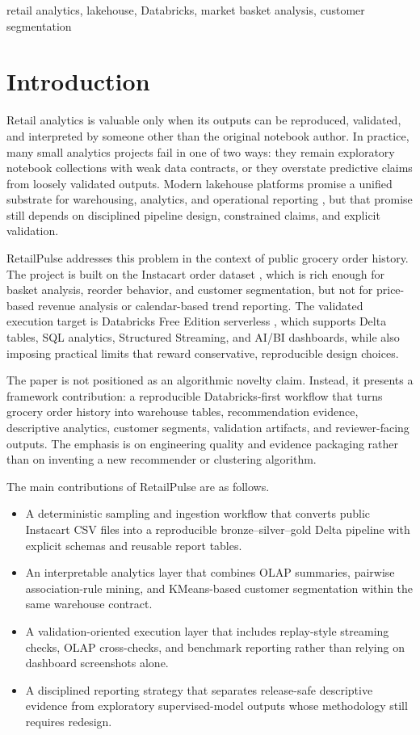 \documentclass[journal]{IEEEtran}
\begin{document}
\begin{IEEEkeywords}
retail analytics, lakehouse, Databricks, market basket analysis, customer segmentation
\end{IEEEkeywords}

\section{Introduction}
Retail analytics is valuable only when its outputs can be reproduced, validated, and interpreted by someone other than the original notebook author. In practice, many small analytics projects fail in one of two ways: they remain exploratory notebook collections with weak data contracts, or they overstate predictive claims from loosely validated outputs. Modern lakehouse platforms promise a unified substrate for warehousing, analytics, and operational reporting \cite{armbrust2020deltalake,zaharia2021lakehouse}, but that promise still depends on disciplined pipeline design, constrained claims, and explicit validation.

RetailPulse addresses this problem in the context of public grocery order history. The project is built on the Instacart order dataset \cite{instacart_dataset}, which is rich enough for basket analysis, reorder behavior, and customer segmentation, but not for price-based revenue analysis or calendar-based trend reporting. The validated execution target is Databricks Free Edition serverless \cite{databricks_free}, which supports Delta tables, SQL analytics, Structured Streaming, and AI/BI dashboards, while also imposing practical limits that reward conservative, reproducible design choices.

The paper is not positioned as an algorithmic novelty claim. Instead, it presents a framework contribution: a reproducible Databricks-first workflow that turns grocery order history into warehouse tables, recommendation evidence, descriptive analytics, customer segments, validation artifacts, and reviewer-facing outputs. The emphasis is on engineering quality and evidence packaging rather than on inventing a new recommender or clustering algorithm.

The main contributions of RetailPulse are as follows.
\begin{itemize}
    \item A deterministic sampling and ingestion workflow that converts public Instacart CSV files into a reproducible bronze--silver--gold Delta pipeline with explicit schemas and reusable report tables.
    \item An interpretable analytics layer that combines OLAP summaries, pairwise association-rule mining, and KMeans-based customer segmentation within the same warehouse contract.
    \item A validation-oriented execution layer that includes replay-style streaming checks, OLAP cross-checks, and benchmark reporting rather than relying on dashboard screenshots alone.
    \item A disciplined reporting strategy that separates release-safe descriptive evidence from exploratory supervised-model outputs whose methodology still requires redesign.
\end{itemize}
\end{document}
